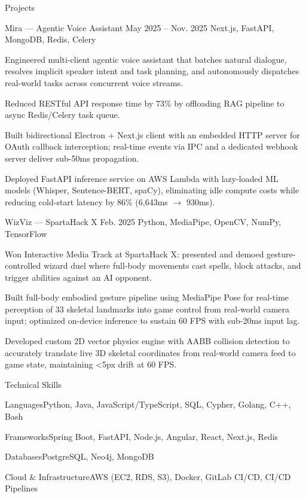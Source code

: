 \documentclass[
	11pt
]{../../../resume}
\begin{document}
	\begin{rSection}{P}{rojects}
		\begin{rSectionEntry}
			{Mira --- Agentic Voice Assistant}
			{May 2025 -- Nov. 2025}
			{}
			{Next.js, FastAPI, MongoDB, Redis, Celery}
			{}

			\item Engineered multi-client agentic voice assistant that batches natural dialogue, resolves implicit speaker intent and task planning, and autonomously dispatches real-world tasks across concurrent voice streams.
			\item Reduced RESTful API response time by 73\% by offloading RAG pipeline to async Redis/Celery task queue.
			\item Built bidirectional Electron + Next.js client with an embedded HTTP server for OAuth callback interception; real-time events via IPC and a dedicated webhook server deliver sub-50ms propagation.
			\item Deployed FastAPI inference service on AWS Lambda with lazy-loaded ML models (Whisper, Sentence-BERT, spaCy), eliminating idle compute costs while reducing cold-start latency by 86\% (6{,}643ms $\rightarrow$ 930ms).
		\end{rSectionEntry}

		\begin{rSectionEntry}
			{WizViz --- SpartaHack X}
			{Feb. 2025}
			{}
			{Python, MediaPipe, OpenCV, NumPy, TensorFlow}
			{}

			\item Won Interactive Media Track at SpartaHack X: presented and demoed gesture-controlled wizard duel where full-body movements cast spells, block attacks, and trigger abilities against an AI opponent.
			\item Built full-body embodied gesture pipeline using MediaPipe Pose for real-time perception of 33 skeletal landmarks into game control from real-world camera input; optimized on-device inference to sustain 60 FPS with sub-20ms input lag.
			\item Developed custom 2D vector physics engine with AABB collision detection to accurately translate live 3D skeletal coordinates from real-world camera feed to game state, maintaining \textless5px drift at 60 FPS.
		\end{rSectionEntry}
	\end{rSection}

	\begin{rSection}{T}{echnical Skills}
		\begin{rSet}{Languages}{Python, Java, JavaScript/TypeScript, SQL, Cypher, Golang, C++, Bash}
		\end{rSet}
		\begin{rSet}{Frameworks}{Spring Boot, FastAPI, Node.js, Angular, React, Next.js, Redis}
		\end{rSet}
		\begin{rSet}{Databases}{PostgreSQL, Neo4j, MongoDB}
		\end{rSet}
		\begin{rSet}{Cloud \& Infrastructure}{AWS (EC2, RDS, S3), Docker, GitLab CI/CD, CI/CD Pipelines}
		\end{rSet}
	\end{rSection}
\end{document}

